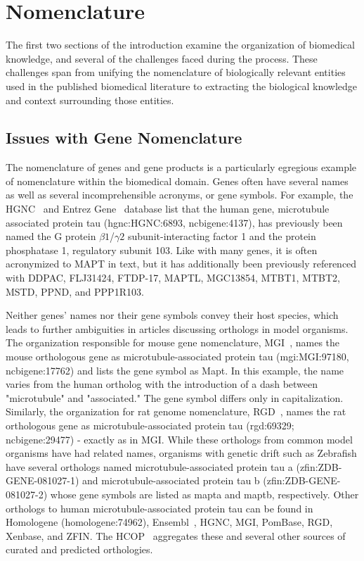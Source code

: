 \section{Nomenclature}

The first two sections of the introduction examine the organization of biomedical knowledge, and several of the challenges faced during the process.
These challenges span from unifying the nomenclature of biologically relevant entities used in the published biomedical literature to extracting the biological knowledge and context surrounding those entities.

\subsection{Issues with Gene Nomenclature}

The nomenclature of genes and gene products is a particularly egregious example of nomenclature within the biomedical domain.
Genes often have several names as well as several incomprehensible acronyms, or gene symbols.
For example, the \ac{HGNC}~\cite{Yates2017} and Entrez Gene~\cite{Maglott2011} database list that the human gene, microtubule associated protein tau (hgnc:HGNC:6893, ncbigene:4137), has previously been named the G protein
$\beta1$/$\gamma2$ subunit-interacting factor 1 and the protein phosphatase 1,
regulatory subunit 103.
Like with many genes, it is often acronymized to MAPT in text, but it has additionally been previously referenced with DDPAC, FLJ31424, FTDP-17, MAPTL, MGC13854, MTBT1, MTBT2, MSTD, PPND, and PPP1R103.

Neither genes' names nor their gene symbols convey their host species, which leads to further ambiguities in articles discussing orthologs in model organisms.
The organization responsible for mouse gene nomenclature, \ac{MGI}~\cite{Blake2017}, names the mouse orthologous gene as microtubule-associated protein tau (mgi:MGI:97180, ncbigene:17762) and lists the gene symbol as Mapt.
In this example, the name varies from the human ortholog with the introduction of a dash between "microtubule" and "associated."
The gene symbol differs only in capitalization.
Similarly, the organization for rat genome nomenclature, \ac{RGD}~\cite{Shimoyama2015}, names the rat orthologous gene as microtubule-associated protein tau (rgd:69329; ncbigene:29477) - exactly as in \ac{MGI}.
While these orthologs from common model organisms have had related names, organisms with genetic drift such as Zebrafish have several orthologs named microtubule-associated protein tau a (zfin:ZDB-GENE-081027-1) and microtubule-associated protein tau b (zfin:ZDB-GENE-081027-2) whose gene symbols are listed as mapta and maptb, respectively.
Other orthologs to human microtubule-associated protein tau can be found in Homologene (homologene:74962), Ensembl~\cite{Zerbino2018}, \ac{HGNC}, \ac{MGI}, PomBase, \ac{RGD}, Xenbase, and \ac{ZFIN}.
The \ac{HCOP}~\cite{Wright2005} aggregates these and several other sources of curated and predicted orthologies.

